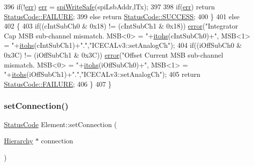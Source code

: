 \begin{DoxyCode}
396         \textcolor{keywordflow}{if}(!\hyperlink{classICECALv3_ad8989925ee5b3ff322d863ce6aaff0bd}{err}) \hyperlink{classICECALv3_ad8989925ee5b3ff322d863ce6aaff0bd}{err} = \hyperlink{classICECALv3_aa0b8358ea0be8e47a8aded5e1551787f}{spiWriteSafe}(spiLsbAddr,lTx);
397 
398         \textcolor{keywordflow}{if}(\hyperlink{classICECALv3_ad8989925ee5b3ff322d863ce6aaff0bd}{err}) \textcolor{keywordflow}{return} \hyperlink{classStatusCode_a6f565cbeadc76d14c72f047e5e85eb4ba3da73d4c469762eb9d3c960368252b26}{StatusCode::FAILURE};
399         \textcolor{keywordflow}{else}        \textcolor{keywordflow}{return} \hyperlink{classStatusCode_a6f565cbeadc76d14c72f047e5e85eb4badd0da38d3ba0d922efd1f4619bc37ad8}{StatusCode::SUCCESS};
400     \}
401     \textcolor{keywordflow}{else} 
402     \{
403         \textcolor{keywordflow}{if}((cIntSubCh0 & 0x18) != (cIntSubCh1 & 0x18)) \hyperlink{classObject_a204a95f57818c0f811933917a30eff45}{error}(\textcolor{stringliteral}{"Integrator Cap MSB sub-channel mismatch.
       MSB<0> = "}+\hyperlink{classICECALv3_a04b02e583f191bfce34d05132cd23834}{itohs}(cIntSubCh0)+\textcolor{stringliteral}{", MSB<1> = "}+\hyperlink{classICECALv3_a04b02e583f191bfce34d05132cd23834}{itohs}(cIntSubCh1)+\textcolor{stringliteral}{"."},\textcolor{stringliteral}{"ICECALv3::setAnalogCh"});
404         \textcolor{keywordflow}{if}((iOffSubCh0 & 0x3C) != (iOffSubCh1 & 0x3C)) \hyperlink{classObject_a204a95f57818c0f811933917a30eff45}{error}(\textcolor{stringliteral}{"Offset Current MSB sub-channel mismatch.
       MSB<0> = "}+\hyperlink{classICECALv3_a04b02e583f191bfce34d05132cd23834}{itohs}(iOffSubCh0)+\textcolor{stringliteral}{", MSB<1> = "}+\hyperlink{classICECALv3_a04b02e583f191bfce34d05132cd23834}{itohs}(iOffSubCh1)+\textcolor{stringliteral}{"."},\textcolor{stringliteral}{"ICECALv3::setAnalogCh"});
405         \textcolor{keywordflow}{return} \hyperlink{classStatusCode_a6f565cbeadc76d14c72f047e5e85eb4ba3da73d4c469762eb9d3c960368252b26}{StatusCode::FAILURE};
406     \}
407 \}
\end{DoxyCode}
\mbox{\label{classElement_ab476b4b1df5954141ceb14f072433b89}} 
\subsubsection{\texorpdfstring{set\+Connection()}{setConnection()}}
{\footnotesize\ttfamily \hyperlink{classStatusCode}{Status\+Code} Element\+::set\+Connection (\begin{DoxyParamCaption}\item[{\hyperlink{classHierarchy}{Hierarchy} $\ast$}]{connection }\end{DoxyParamCaption})\hspace{0.3cm}{\ttfamily [inherited]}}

